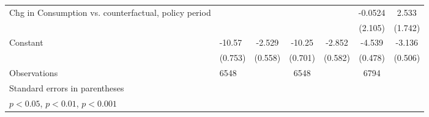 \begin{table}[htbp]
\begin{tabular}{p{0.8in}l*{5}{c}}
Chg in Consumption vs. counterfactual, policy period&                     &                     &                     &                     &     -0.0524         &       2.533         \\
                    &                     &                     &                     &                     &     (2.105)         &     (1.742)         \\
Constant            &      -10.57\sym{***}&      -2.529\sym{***}&      -10.25\sym{***}&      -2.852\sym{***}&      -4.539\sym{***}&      -3.136\sym{***}\\
                    &     (0.753)         &     (0.558)         &     (0.701)         &     (0.582)         &     (0.478)         &     (0.506)         \\
\hline
Observations        &        6548         &                     &        6548         &                     &        6794         &                     \\
\hline\hline
\multicolumn{7}{l}{\footnotesize Standard errors in parentheses}\\
\multicolumn{7}{l}{\footnotesize \sym{*} \(p<0.05\), \sym{**} \(p<0.01\), \sym{***} \(p<0.001\)}\\
\end{tabular}
\end{table}
